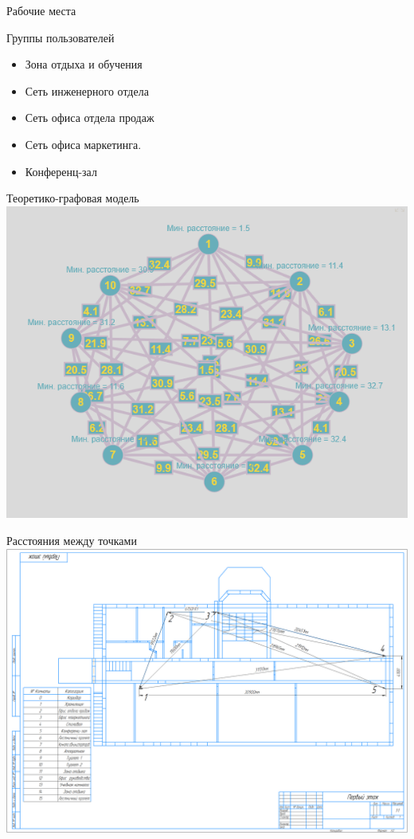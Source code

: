 \documentclass[aspectratio=169]{beamer}
\begin{document}
\begin{frame}{Рабочие места}
	\begin{block}{\large Группы пользователей}
	\vspace{0.1cm}
		\begin{itemize}
			\setlength{\leftmargin}{1.5cm}
			\setlength{\itemindent}{0.5cm}
			\setlength{\itemsep}{0.3cm}
			
			\item Зона отдыха и обучения
			\item Сеть инженерного отдела
			\item Сеть офиса отдела продаж
			\item Сеть офиса маркетинга.
			\item Конференц-зал
		\end{itemize}
	\end{block}
\end{frame}

\begin{frame}{Теоретико-графовая модель}
	\centering
	\includegraphics[width=0.7\linewidth]{images/Теоретико-графовая модель.png}
\end{frame}

\begin{frame}{Расстояния между точками}
	\centering
	\includegraphics[width=0.7\linewidth]{images/Полная схема для расчётов(1 этаж).png}
\end{frame}
\end{document}
